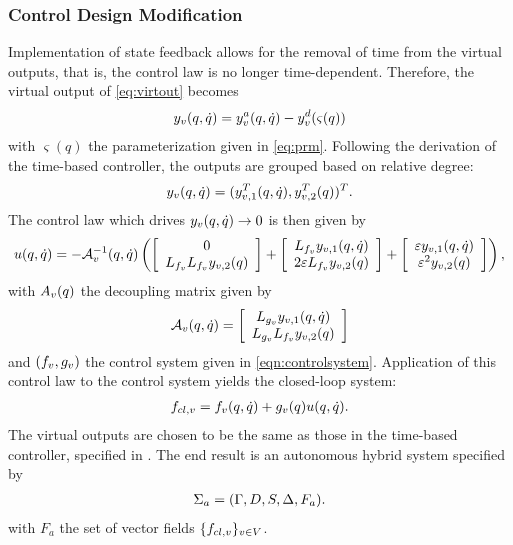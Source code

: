 \subsubsection{Control Design Modification}
Implementation of state feedback allows for the removal of time from the virtual
outputs, that is, the control law is no longer time-dependent.
%
Therefore, the virtual output of \eqref{eq:virtout} becomes
\begin{align*}
  y_{v}(q, {\dot q}) = y_{v}^a(q, {\dot q}) - y_{v}^{d}(\varsigma(q))
\end{align*}
with $\varsigma(q)$ the parameterization given in \eqref{eq:prm}.
%
Following the derivation of the time-based controller, the outputs are grouped
based on relative degree:
\begin{align*}
  y_{v}(q, {\dot q}) = (y_{v,1}^{T}(q, {\dot q}), y_{v,2}^{T}(q))^{T}.
\end{align*}
The control law which drives $y_{v}(q, {\dot q}) \to 0$ is then given by
\begin{align*}
  u(q, {\dot q}) = -\mathcal{A}_{v}^{-1}(q, {\dot q}) \left(
  \left[ \begin{array}{c}
      0\\
      L_{f_{v}} L_{f_{v}} y_{v,2}(q)
    \end{array} \right] +
  \left[ \begin{array}{c}
      L_{f_{v}} y_{v,1}(q, {\dot q})\\
      2 \varepsilon L_{f_{v}} y_{v,2}(q)
    \end{array} \right] +
  \left[ \begin{array}{c}
      \varepsilon y_{v,1}(q, {\dot q})\\
      \varepsilon^2 y_{v,2}(q)
    \end{array} \right]\right),
\end{align*}
with $A_{v}(q)$ the decoupling matrix given by
\begin{align}
  \mathcal{A}_{v}(q, {\dot q}) =
  \left[\begin{array}{c}
      L_{g_{v}} y_{v,1} (q, {\dot q})\\
      L_{g_{v}} L_{f_{v}} y_{{v},2}(q)
    \end{array}\right]
\end{align}
and $(f_{v}, g_{v})$ the control system given in \eqref{eqn:controlsystem}.
%
Application of this control law to the control system yields the closed-loop
system:
\begin{align}
  f_{cl,v} = f_{v}(q, {\dot q}) + g_{v}(q) u(q, {\dot q}).
\end{align}
The virtual outputs are chosen to be the same as those in the time-based
controller, specified in .
%
The end result is an autonomous hybrid system specified by
\begin{align}
  \Sigma_{a} = (\Gamma, D, S, \Delta, F_a).
\end{align}
with $F_a$ the set of vector fields $\{f_{cl,v}\}_{v \in V}$.

